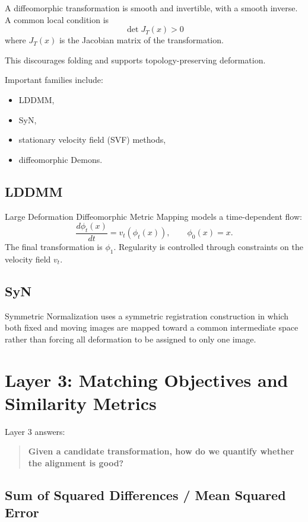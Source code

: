 \documentclass[11pt,a4paper]{article}
\begin{document}
A diffeomorphic transformation is smooth and invertible, with a smooth inverse. A common local condition is
\[
\boxed{\det J_T(x)>0}
\]
where $J_T(x)$ is the Jacobian matrix of the transformation.

This discourages folding and supports topology-preserving deformation.

Important families include:
\begin{itemize}
  \item LDDMM,
  \item SyN,
  \item stationary velocity field (SVF) methods,
  \item diffeomorphic Demons.
\end{itemize}

\subsection{LDDMM}

Large Deformation Diffeomorphic Metric Mapping models a time-dependent flow:
\[
\frac{d\phi_t(x)}{dt}
=
v_t(\phi_t(x)),
\qquad
\phi_0(x)=x.
\]
The final transformation is $\phi_1$. Regularity is controlled through constraints on the velocity field $v_t$.

\subsection{SyN}

Symmetric Normalization uses a symmetric registration construction in which both fixed and moving images are mapped toward a common intermediate space rather than forcing all deformation to be assigned to only one image.

\section{Layer 3: Matching Objectives and Similarity Metrics}

Layer 3 answers:

\begin{quote}
\textbf{Given a candidate transformation, how do we quantify whether the alignment is good?}
\end{quote}

\subsection{Sum of Squared Differences / Mean Squared Error}
\end{document}
